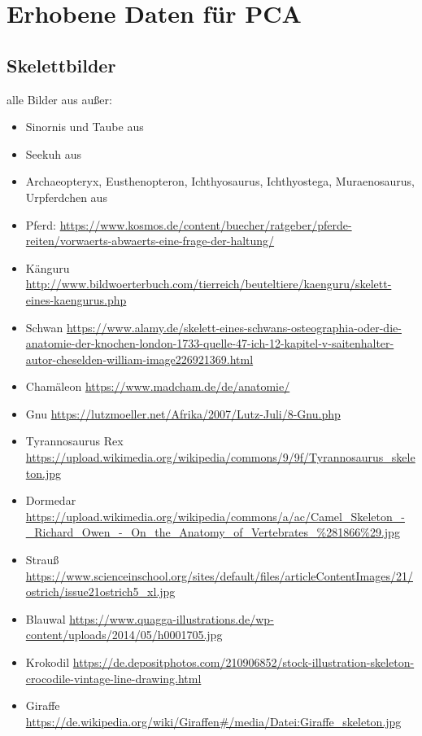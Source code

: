 \chapter{Erhobene Daten für PCA}
\label{appendix_pca}

 
 \section{Skelettbilder}
 \label{appendix_pca_skeletons}
 
 alle Bilder aus \cite{Spezielle_Zoologie} außer:
 \begin{itemize}
  \item Sinornis und Taube aus \cite{Vergleichende_Anatomie}
  \item Seekuh aus \cite{Zoologie25Wehner}
  \item Archaeopteryx, Eusthenopteron, Ichthyosaurus, Ichthyostega, Muraenosaurus, Urpferdchen aus \cite{Zoologie24Wehner}
  \item Pferd: \url{https://www.kosmos.de/content/buecher/ratgeber/pferde-reiten/vorwaerts-abwaerts-eine-frage-der-haltung/}
  \item Känguru \url{http://www.bildwoerterbuch.com/tierreich/beuteltiere/kaenguru/skelett-eines-kaengurus.php}
  \item Schwan \url{https://www.alamy.de/skelett-eines-schwans-osteographia-oder-die-anatomie-der-knochen-london-1733-quelle-47-ich-12-kapitel-v-saitenhalter-autor-cheselden-william-image226921369.html}
  \item Chamäleon \url{https://www.madcham.de/de/anatomie/}
  \item Gnu \url{https://lutzmoeller.net/Afrika/2007/Lutz-Juli/8-Gnu.php}
  \item Tyrannosaurus Rex \url{https://upload.wikimedia.org/wikipedia/commons/9/9f/Tyrannosaurus_skeleton.jpg}
  \item Dormedar \url{https://upload.wikimedia.org/wikipedia/commons/a/ac/Camel_Skeleton_-_Richard_Owen_-_On_the_Anatomy_of_Vertebrates_\%281866\%29.jpg}
  \item Strauß \url{https://www.scienceinschool.org/sites/default/files/articleContentImages/21/ostrich/issue21ostrich5_xl.jpg}
  \item Blauwal \url{https://www.quagga-illustrations.de/wp-content/uploads/2014/05/h0001705.jpg}
  \item Krokodil \url{https://de.depositphotos.com/210906852/stock-illustration-skeleton-crocodile-vintage-line-drawing.html}
  \item Giraffe \url{https://de.wikipedia.org/wiki/Giraffen#/media/Datei:Giraffe_skeleton.jpg}
 \end{itemize}

